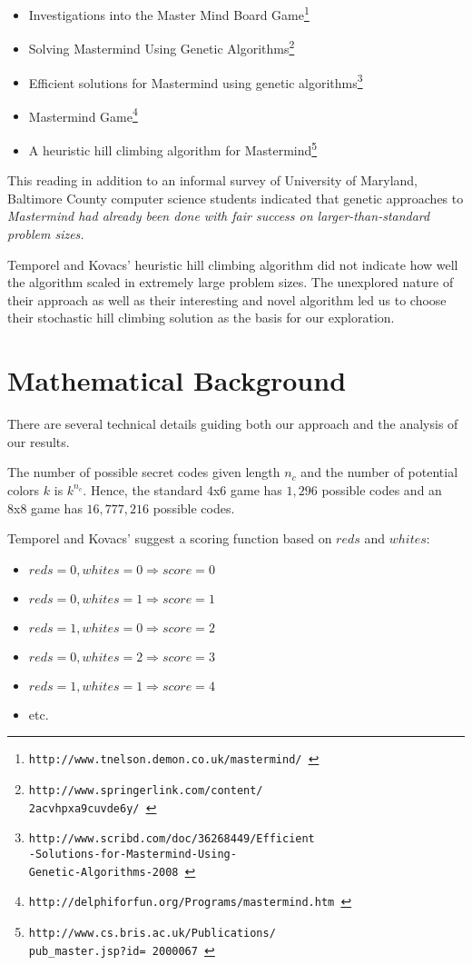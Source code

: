 \documentclass[11pt,twocolumn]{article}
\begin{document}
\begin{itemize}
\item Investigations into the Master Mind Board Game\footnote{\tt http://www.tnelson.demon.co.uk/mastermind/ \rm}
\item Solving Mastermind Using Genetic Algorithms\footnote{\tt http://www.springerlink.com/content/\\2acvhpxa9cuvde6y/ \rm}
\item Efficient solutions for Mastermind using genetic algorithms\footnote{\tt http://www.scribd.com/doc/36268449/Efficient\\-Solutions-for-Mastermind-Using-\\Genetic-Algorithms-2008 \rm}
\item Mastermind Game\footnote{\tt http://delphiforfun.org/Programs/mastermind.htm \rm}
\item A heuristic hill climbing algorithm for Mastermind\footnote{\tt http://www.cs.bris.ac.uk/Publications/\\pub\_master.jsp?id= 2000067 \rm}
\end{itemize}

This reading in addition to an informal survey of University of Maryland, Baltimore County computer science students indicated that genetic approaches to \em Mastermind \rm had already been done with fair success on larger-than-standard problem sizes. 

Temporel and Kovacs' heuristic hill climbing algorithm did not indicate how well the algorithm scaled in extremely large problem sizes. The unexplored nature of their approach as well as their interesting and novel algorithm led us to choose their stochastic hill climbing solution as the basis for our exploration.

\section{Mathematical Background}

There are several technical details guiding both our approach and the analysis of our results. 

The number of possible secret codes given length $n_c$ and the number of potential colors $k$ is $k^{n_c}$. Hence, the standard 4x6 game has $1,296$ possible codes and an 8x8 game has $16,777,216$ possible codes.

Temporel and Kovacs' suggest a scoring function based on $reds$ and $whites$: 

\begin{itemize}
\item $reds = 0, whites = 0 \Rightarrow score = 0$
\item $reds = 0, whites = 1 \Rightarrow score = 1$
\item $reds = 1, whites = 0 \Rightarrow score = 2$
\item $reds = 0, whites = 2 \Rightarrow score = 3$
\item $reds = 1, whites = 1 \Rightarrow score = 4$
\item etc. 
\end{itemize}
\end{document}
